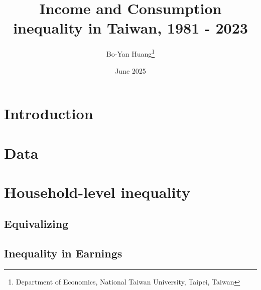 \documentclass{article}
\title{Income and Consumption inequality in Taiwan, 1981 - 2023}
\author{Bo-Yan Huang\footnote{Department of Economics, National Taiwan University, Taipei, Taiwan}}
\date{June 2025}
\begin{document}
\maketitle

\section{Introduction}

\section{Data}

\section{Household-level inequality}

\subsection{Equivalizing}

\subsection{Inequality in Earnings}
\end{document}
